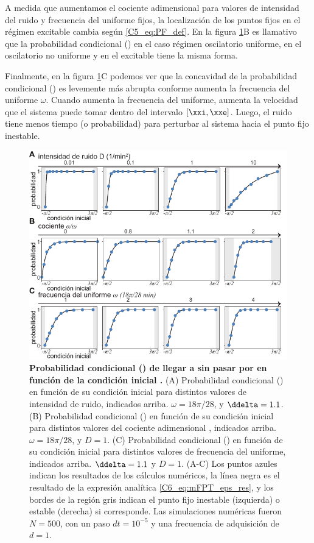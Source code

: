 {A medida que aumentamos el cociente adimensional \ddelta para valores de intensidad del ruido y frecuencia del uniforme fijos, la localización de los puntos fijos en el régimen excitable cambia según \ref{C5_eq:PF_def}. En la figura \ref{C6_fig:mFPT_eps}B es llamativo que la probabilidad condicional \epsplus(\xx) en el caso régimen oscilatorio uniforme, en el oscilatorio no uniforme y en el excitable tiene la misma forma. 

Finalmente, en la figura  \ref{C6_fig:mFPT_eps}C podemos ver que la concavidad de la probabilidad condicional \epsplus(\xx) es levemente más abrupta conforme aumenta la frecuencia del uniforme $\omega$.  Cuando aumenta la frecuencia del uniforme, aumenta la velocidad que el sistema puede tomar dentro del intervalo $[\xxi,\xxe]$. Luego, el ruido tiene menos tiempo (o probabilidad) para perturbar al sistema hacia el punto fijo inestable. 


\begin{figure}
    \centering
    \includegraphics[width=1\columnwidth]{figures/chapter6/C6_eps_plus.pdf} 
    \caption{\textbf{Probabilidad condicional \epsplus(\xx) de llegar a \xxe sin pasar por \xxi en función de la condición inicial \xx.} (A) Probabilidad condicional \epsplus(\xx) en función de su condición inicial \xx para distintos valores de intensidad de ruido, indicados arriba. $\omega = 18\pi/28$, y $\ddelta = 1.1$. (B) Probabilidad condicional \epsplus(\xx) en función de su condición inicial \xx para distintos valores del cociente adimensional \ddelta, indicados arriba. $\omega = 18\pi/28$, y $D = 1$. (C) Probabilidad condicional \epsplus(\xx) en función de su condición inicial \xx para distintos valores de frecuencia del uniforme, indicados arriba. $\ddelta = 1.1$ y $D=1$. (A-C) Los puntos azules indican los resultados de los cálculos numéricos, la línea negra es el resultado de la expresión analítica \ref{C6_eq:mFPT_eps_res}, y los bordes de la región gris indican el punto fijo inestable (izquierda) o estable (derecha) si corresponde. Las simulaciones numéricas fueron $N=500$, con un paso $dt = 10^{-5}$ y una frecuencia de adquisición de $d=1$.}
    \label{C6_fig:mFPT_eps}
\end{figure}



}
